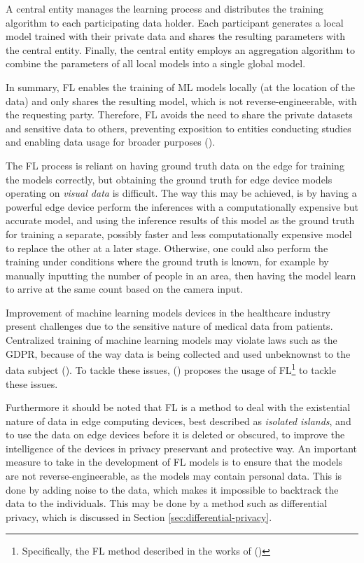 \begin{myquote}
    A central entity manages the learning process and distributes the training algorithm to each participating data holder. Each participant generates a local model trained with their private data and shares the resulting parameters with the central entity. Finally, the central entity employs an aggregation algorithm to combine the parameters of all local models into a single global model.
\end{myquote}

In summary, FL enables the training of ML models locally (at the location of the data) and only shares the resulting model, which is not reverse-engineerable, with the requesting party. Therefore, FL avoids the need to share the private datasets and sensitive data to others, preventing exposition to entities conducting studies and enabling data usage for broader purposes (\cite{re2021servertoclientml}). 

The FL process is reliant on having ground truth data on the edge for training the models correctly, but obtaining the ground truth for edge device models operating on \textit{visual data} is difficult. The way this may be achieved, is by having a powerful edge device perform the inferences with a computationally expensive but accurate model, and using the inference results of this model as the ground truth for training a separate, possibly faster and less computationally expensive model to replace the other at a later stage. Otherwise, one could also perform the training under conditions where the ground truth is known, for example by manually inputting the number of people in an area, then having the model learn to arrive at the same count based on the camera input.

Improvement of machine learning models devices in the healthcare industry present challenges due to the sensitive nature of medical data from patients. Centralized training of machine learning models may violate laws such as the GDPR, because of the way data is being collected and used unbeknownst to the data subject (\cite{an2022federatedlearninghealthcare}). To tackle these issues, \citeauthor{an2022federatedlearninghealthcare} (\citeyear{an2022federatedlearninghealthcare}) proposes the usage of FL\footnote{Specifically, the FL method described in the works of \citeauthor{ya2019federatedMLconcepts}(\citeyear{ya2019federatedMLconcepts})} to tackle these issues.

Furthermore it should be noted that FL is a method to deal with the existential nature of data in edge computing devices, best described as \textit{isolated islands}, and to use the data on edge devices before it is deleted or obscured, to improve the intelligence of the devices in privacy preservant and protective way. An important measure to take in the development of FL models is to ensure that the models are not reverse-engineerable, as the models may contain personal data. This is done by adding noise to the data, which makes it impossible to backtrack the data to the individuals. This may be done by a method such as differential privacy, which is discussed in Section \ref{sec:differential-privacy}.

